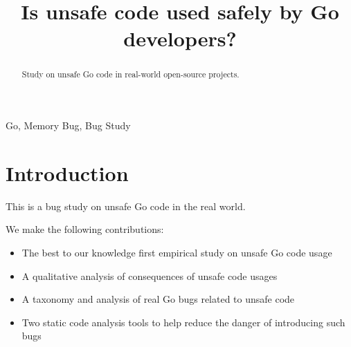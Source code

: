 \documentclass[conference]{../styles/IEEEtran}
\begin{document}
    \title{Is unsafe code used safely by Go developers?}

    \author{
        \and
        \and
        \and
    }

    \maketitle

    \begin{abstract}
        Study on unsafe Go code in real-world open-source projects.
    \end{abstract}

    \begin{IEEEkeywords}
        Go, Memory Bug, Bug Study
    \end{IEEEkeywords}


    \section{Introduction}

    This is a bug study on unsafe Go code in the real world.

    We make the following contributions:

    \begin{itemize}
        \item The best to our knowledge first empirical study on unsafe Go code usage
        \item A qualitative analysis of consequences of unsafe code usages
        \item A taxonomy and analysis of real Go bugs related to unsafe code
        \item Two static code analysis tools to help reduce the danger of introducing such bugs
    \end{itemize}
\end{document}
